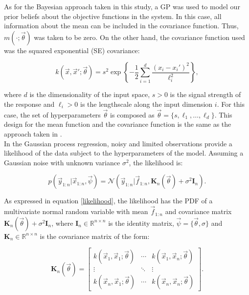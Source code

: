 \documentclass{article}
\begin{document}
As for the Bayesian approach taken in this study, a GP was used to model our prior beliefs about the objective functions in the system. In this case, all information about the mean can be included in the covariance function. Thus, $m(\cdot;\vec{\theta})$ was taken to be zero. On the other hand, the covariance function used was the squared exponential (SE) covariance:

\begin{equation}
    k(\vec{x},\vec{x}';\vec{\theta}) = s^2 \exp \left \{ -\frac{1}{2}\sum_{i=1}^{d}\frac{(x_i - x_i')^2}{\ell_i^2} \right \},
\end{equation}

where $d$ is the dimensionality of the input space, $s > 0$ is the signal strength of the response and $\ell_i > 0$ is the lengthscale along the input dimension $i$. For this case, the set of hyperparameters $\vec{\theta}$ is composed as $\vec{\theta} = \{s, \ell_1, \ldots, \ell_d\}$. This design for the mean function and the covariance function is the same as the approach taken in \cite{Pandita2016}.\\

In the Gaussian process regression, noisy and limited observations provide a likelihood of the data subject to the hyperparameters of the model. Assuming a Gaussian noise with unknown variance $\sigma^2$, the likelihood is\cite{Pandita2016}:

\begin{equation}
    p(\vec{y}_{1:n}|\vec{x}_{1:n}, \vec{\psi}) = \mathcal{N}(\vec{y}_{1:n}|\vec{f}_{1:n},\textbf{K}_n(\vec{\theta}) + \sigma^2\textbf{I}_n).
    \label{likelihood}
\end{equation}

As expressed in equation \ref{likelihood}, the likelihood has the PDF of a multivariate normal random variable with mean $\vec{f}_{1:n}$ and covariance matrix $\textbf{K}_n(\vec{\theta}) + \sigma^2\textbf{I}_n$, where $\textbf{I}_n \in \mathbb{R}^{n\times n}$ is the identity matrix, $\vec{\psi} = \{ \vec{\theta}, \sigma \} $ and $\textbf{K}_n \in \mathbb{R}^{n\times n}$ is the covariance matrix of the form:

\begin{equation}
    \textbf{K}_n(\vec{\theta}) =
    \begin{bmatrix}
        k(\vec{x}_1,\vec{x}_1;\vec{\theta}) & \cdots & k(\vec{x}_1,\vec{x}_n;\vec{\theta}) \\
        \vdots & \ddots & \vdots\\
        k(\vec{x}_n,\vec{x}_1;\vec{\theta}) & \cdots & k(\vec{x}_n,\vec{x}_n;\vec{\theta})
    \end{bmatrix}.
\end{equation}
\end{document}
